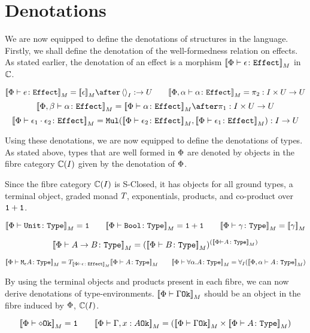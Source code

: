 \documentclass{Report}
\begin{document}
\section{Denotations}
We are now equipped to define the denotations of structures in the language. Firstly, we shall define the denotation of the well-formedness relation on effects. As stated earlier, the denotation of an effect is a morphism $\deno{\typerelation{\P}{\e}{\effect}}$ in $\C$.

\[
    \deno{\typerelation{\P}{e}{\effect}} = \deno{\e} \after \term{I}: \rightarrow U
    \quad\quad
    \deno{\typerelation{\P,\a}{\a}{\effect}} = \pp: I\times U \rightarrow U
\]\[
    \deno{\typerelation{\P, \b}{\a}{\effect}} = \deno{\typerelation{\P}{\a}{\effect}}\after\p: I\times U\rightarrow U
\]\[
    \deno{\typerelation{\P}{\e_1\dot \e_2}{\effect}} = \Mul(\deno{\typerelation{\P}{\e_2}{\effect}},\deno{\typerelation{\P}{\e_1}{\effect}}): I \rightarrow U
\]

Using these denotations, we are now equipped to define the denotations of types. As stated above, types that are well formed in $\P$ are denoted by objects in the fibre category $\C(I)$ given by the denotation of $\P$.

Since the fibre category $\C(I)$ is S-Closed, it has objects for all ground types, a terminal object, graded monad $\T{}{}$, exponentials, products, and co-product over $\1+\1$.

\[
    \deno{\typerelation{\P}{\U}{\type}} = \1
    \quad\quad
    \deno{\typerelation{\P}{\B}{\type}} = \1+\1
    \quad\quad
    \deno{\typerelation{\P}{\g}{\type}} = \deno{\g}
\] 

\[
    \deno{\typerelation{\P}{\ab}{\type}} = (\deno{\typerelation{\P}{B}{\type}})^{(\deno{\typerelation{\P}{A}{\type}})}
\]

\[
    \deno{\typerelation{\P}{\mea}{\type}} =\T{\deno{\typerelation{\P}{\e}{\effect}}}{\deno{\typerelation{\P}{A}{\type}}}
    \quad\quad
    \deno{\typerelation{\P}{\all{\a}{A}}{\type}} =\allI(\deno{\typerelation{\P,\a}{A}{\type}})
\]


By using the terminal objects and products present in each fibre, we can now derive denotations of type-environments. $\deno{\oke{\P}{\G}}$ should be an object in the fibre induced by $\P$, $\C(I)$.

\[
    \deno{\wellformedok{\P}{\nil}} = \1
    \quad\quad
    \deno{\wellformedok{\P}{\gax}} = (\deno{\wellformedok{\P}{\G}} \times \deno{\typerelation{\P}{A}{\type}})
\]
\end{document}
